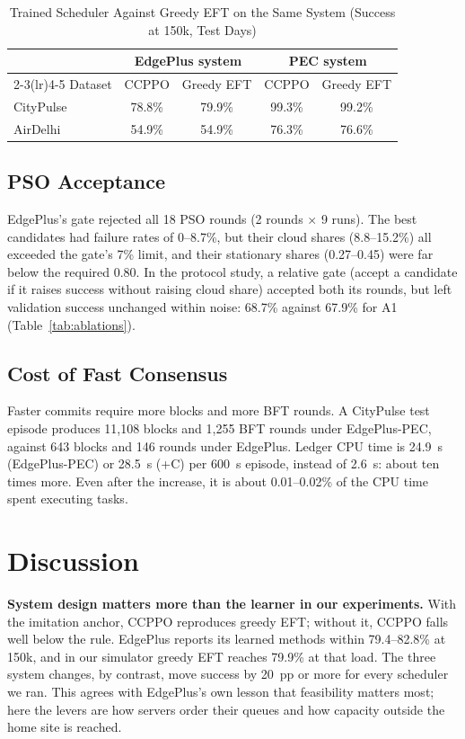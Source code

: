 \documentclass[11pt,journal,onecolumn]{IEEEtran}
\begin{document}
\begin{table}[!t]
\centering
\caption{Trained Scheduler Against Greedy EFT on the Same System (Success at 150k, Test Days)}
\label{tab:learned}
\footnotesize
\begin{tabular}{lcccc}
\toprule
 & \multicolumn{2}{c}{EdgePlus system} & \multicolumn{2}{c}{PEC system}\\
\cmidrule(lr){2-3}\cmidrule(lr){4-5}
Dataset & CCPPO & Greedy EFT & CCPPO & Greedy EFT\\
\midrule
CityPulse & 78.8\% & 79.9\% & 99.3\% & 99.2\%\\
AirDelhi & 54.9\% & 54.9\% & 76.3\% & 76.6\%\\
\bottomrule
\end{tabular}
\end{table}

\subsection{PSO Acceptance}
EdgePlus's gate rejected all 18 PSO rounds (2 rounds $\times$ 9 runs). The best candidates had failure rates of 0--8.7\%, but their cloud shares (8.8--15.2\%) all exceeded the gate's 7\% limit, and their stationary shares (0.27--0.45) were far below the required 0.80. In the protocol study, a relative gate (accept a candidate if it raises success without raising cloud share) accepted both its rounds, but left validation success unchanged within noise: 68.7\% against 67.9\% for A1 (Table~\ref{tab:ablations}).

\subsection{Cost of Fast Consensus}
Faster commits require more blocks and more BFT rounds. A CityPulse test episode produces 11,108 blocks and 1,255 BFT rounds under EdgePlus-PEC, against 643 blocks and 146 rounds under EdgePlus. Ledger CPU time is 24.9~s (EdgePlus-PEC) or 28.5~s (+C) per 600~s episode, instead of 2.6~s: about ten times more. Even after the increase, it is about 0.01--0.02\% of the CPU time spent executing tasks.

\section{Discussion}
\label{sec:discussion}

\textbf{System design matters more than the learner in our experiments.} With the imitation anchor, CCPPO reproduces greedy EFT; without it, CCPPO falls well below the rule. EdgePlus reports its learned methods within 79.4--82.8\% at 150k, and in our simulator greedy EFT reaches 79.9\% at that load. The three system changes, by contrast, move success by 20~pp or more for every scheduler we ran. This agrees with EdgePlus's own lesson that feasibility matters most; here the levers are how servers order their queues and how capacity outside the home site is reached.
\end{document}
